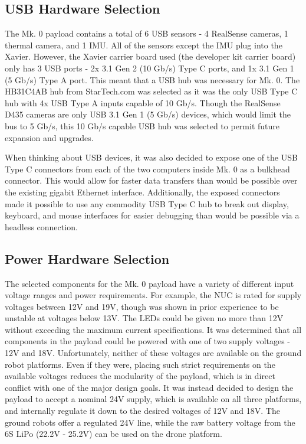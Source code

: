 \subsection{USB Hardware Selection}
The Mk. 0 payload contains a total of 6 USB sensors - 4 RealSense cameras, 1 thermal camera, and 1 IMU. All of the sensors except the IMU plug into the Xavier. However, the Xavier carrier board used (the developer kit carrier board) only has 3 USB ports - 2x 3.1 Gen 2 (10 Gb/s) Type C ports, and 1x 3.1 Gen 1 (5 Gb/s) Type A port. This meant that a USB hub was necessary for Mk. 0. The HB31C4AB hub from StarTech.com was selected as it was the only USB Type C hub with 4x USB Type A inputs capable of 10 Gb/s. Though the RealSense D435 cameras are only USB 3.1 Gen 1 (5 Gb/s) devices, which would limit the bus to 5 Gb/s, this 10 Gb/s capable USB hub was selected to permit future expansion and upgrades.

When thinking about USB devices, it was also decided to expose one of the USB Type C connectors from each of the two computers inside Mk. 0 as a bulkhead connector. This would allow for faster data transfers than would be possible over the existing gigabit Ethernet interface. Additionally, the exposed connectors made it possible to use any commodity USB Type C hub to break out display, keyboard, and mouse interfaces for easier debugging than would be possible via a headless connection.

\subsection{Power Hardware Selection}

The selected components for the Mk. 0 payload have a variety of different input voltage ranges and power requirements. For example, the NUC is rated for supply voltages between 12V and 19V, though was shown in prior experience to be unstable at voltages below 13V. The LEDs could be given no more than 12V without exceeding the maximum current specifications. It was determined that all components in the payload could be powered with one of two supply voltages - 12V and 18V. Unfortunately, neither of these voltages are available on the ground robot platforms. Even if they were, placing such strict requirements on the available voltages reduces the modularity of the payload, which is in direct conflict with one of the major design goals. It was instead decided to design the payload to accept a nominal 24V supply, which is available on all three platforms, and internally regulate it down to the desired voltages of 12V and 18V. The ground robots offer a regulated 24V line, while the raw battery voltage from the 6S LiPo (22.2V - 25.2V) can be used on the drone platform.

